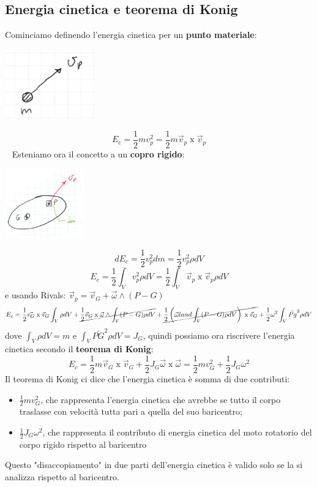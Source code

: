 \subsection{Energia cinetica e teorema di Konig}
Cominciamo definendo l'energia cinetica per un \textbf{punto materiale}:
\begin{center}
    \includegraphics[height=3cm]{../lezione10/img1.JPG}
\end{center}
\[
    E_c = \frac{1}{2} m v_p^2 = \frac{1}{2}m \vec{v}_p \;\text{x}\;\vec{v}_p
\]
\ \newline
Esteniamo ora il concetto a un \textbf{copro rigido}:
\begin{center}
    \includegraphics[height=3cm]{../lezione10/img2.JPG}
\end{center}
\[
    dE_c = \frac{1}{2} v_p^2 dm = \frac{1}{2} v_p^2 \rho dV
\]
\[
    E_c = \frac{1}{2} \int_V v_p^2 \rho dV = \frac{1}{2} \int_V \vec{v}_p \;\text{x}\; \vec{v}_p \rho dV
\]
e usando Rivals: $\vec{v}_p = \vec{v}_G + \vec{\omega} \land (P-G)$
\[
    E_c = \frac{1}{2} \vec{v_G} \;\text{x}\;\vec{v}_G \int_V \rho d V + \cancel{\frac{1}{2} \vec{v}_G \;\text{x}\; \vec{\omega} \land \int_V (P-G) \rho d V} + \cancel{\frac{1}{2} \left( \vec{\omega} land \int_V (P-G) \rho d V \right) \; \text{x}\; \vec{v}_G} + \frac{1}{2} \omega^2 \int_V \bar{Pg}^2 \rho d V
\]
dove $\int_V \rho d V = m$ e $\int_V \bar{PG}^2 \rho dV = J_G$, quindi possiamo ora riscrivere l'energia cinetica secondo il \textbf{teorema di Konig}:
\[
    E_c= \frac{1}{2} m \vec{v}_G \;\text{x}\; \vec{v}_G + \frac{1}{2} J_G \vec{\omega} \;\text{x}\; \vec{\omega} = \frac{1}{2} m v_G^2 + \frac{1}{2} J_G \omega^2
\]
Il teorema di Konig ci dice che l'energia cinetica è somma di due contributi:
\begin{itemize}
    \item $\frac{1}{2} m v_G^2$, che rappresenta l'energia cinetica che avrebbe se tutto il corpo traslasse con velocità tutta pari a quella del suo baricentro;
    \item $\frac{1}{2} J_G \omega^2$, che rappresenta il contributo di energia cinetica del moto rotatorio del corpo rigido rispetto al baricentro 
\end{itemize}
Questo "disaccopiamento" in due parti dell'energia cinetica è valido solo se la si analizza rispetto al baricentro.
